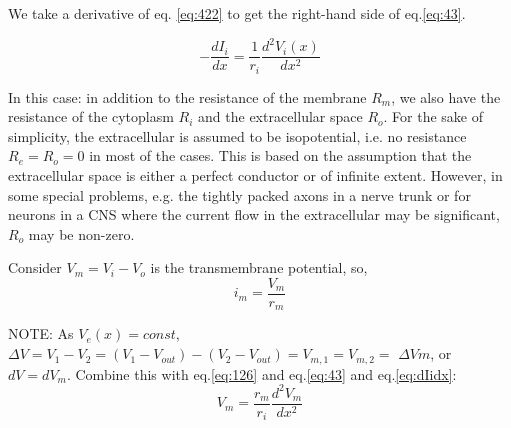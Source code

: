 We take a derivative of eq. \ref{eq:422} to get the right-hand side of
eq.\ref{eq:43}.

\begin{equation}
  \label{eq:dIidx}
  -\frac{dI_i}{dx} =  \frac{1}{r_i} \frac{d^2 V_i(x)}{d x^2}
\end{equation} 


\begin{mdframed}

In this case: in addition to the resistance of the membrane $R_m$, we also have
the resistance of the cytoplasm $R_i$ and the extracellular space $R_o$. For the
sake of simplicity, the extracellular is assumed to be isopotential, i.e. no
resistance $R_e=R_o=0$ in most of the cases. This is based on the assumption
that the extracellular space is either a perfect conductor or of infinite
extent.
However, in some special problems, e.g. the tightly packed axons in a nerve
trunk or for neurons in a CNS where the current flow in the extracellular may be
significant, $R_o$ may be non-zero.
\end{mdframed}

Consider $V_m = V_i - V_o$ is the transmembrane potential, so,
\begin{equation}
  \label{eq:126}
  i_m =  \frac{V_m}{r_m}
\end{equation}


NOTE: As $V_e(x)= const$, 
$\Delta V = V_1-V_2 = (V_1 - V_{out}) - (V_2 -V_{out}) = V_{m,1} = V_{m,2} =$
$\Delta Vm$, or $d V = d V_m$.
Combine this with eq.\ref{eq:126} and eq.\ref{eq:43} and eq.\ref{eq:dIidx}:
\begin{equation}
  \label{eq:127}
  V_m = \frac{r_m}{r_i} \frac{d ^2V_m}{d x^2}
\end{equation}

